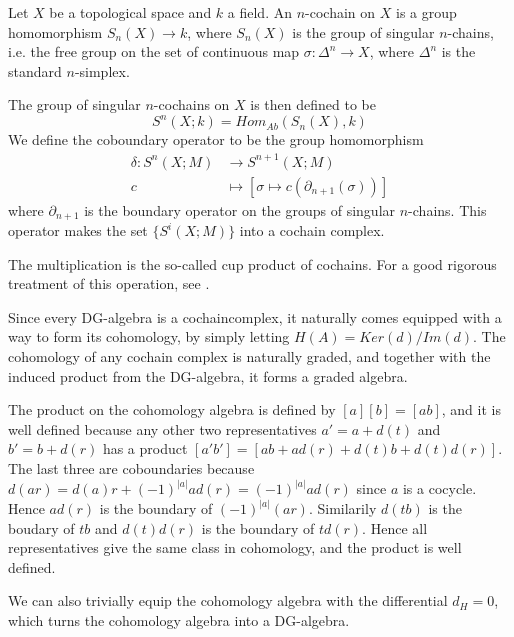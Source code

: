 \begin{example}
\label{ex:singular_cochain_algebra}
Let $X$ be a topological space and $k$ a field. An $n$-cochain on $X$ is a group homomorphism $S_n(X)\longrightarrow k$, where $S_n(X)$ is the group of singular $n$-chains, i.e. the free group on the set of continuous map $\sigma\colon\Delta^n\longrightarrow X$, where $\Delta^n$ is the standard $n$-simplex. 

The group of singular $n$-cochains on $X$ is then defined to be 
\begin{equation*}
S^n(X;k) = Hom_{Ab}(S_n(X), k)
\end{equation*}
We define the coboundary operator to be the group homomorphism
\begin{align*}
	\delta\colon S^n(X;M)&\longrightarrow S^{n+1}(X;M) \\
	c &\longmapsto [\sigma\mapsto c(\partial_{n+1}(\sigma))]
\end{align*}
where $\partial_{n+1}$ is the boundary operator on the groups of singular $n$-chains. This operator makes the set $\{S^i(X;M)\}$ into a cochain complex. 

The multiplication is the so-called cup product of cochains. For a good rigorous treatment of this operation, see \cite[Section 3.2.]{hatcher}. 
\end{example}

\begin{example}
\label{ex:cohomology}
Since every DG-algebra is a cochaincomplex, it naturally comes equipped with a way to form its cohomology, by simply letting $H(A)=Ker(d)/Im(d)$. The cohomology of any cochain complex is naturally graded, and together with the induced product from the DG-algebra, it forms a graded algebra. 
    
The product on the cohomology algebra is defined by $[a][b]=[ab]$, and it is well defined because any other two representatives $a'=a+d(t)$ and $b'=b+d(r)$ has a product $[a'b']=[ab+ad(r)+d(t)b+d(t)d(r)]$. The last three are coboundaries because $d(ar)=d(a)r + (-1)^{|a|}ad(r) = (-1)^{|a|}ad(r)$ since $a$ is a cocycle. Hence $ad(r)$ is the boundary of $(-1)^{|a|}(ar)$. Similarily $d(tb)$ is the boudary of $tb$ and $d(t)d(r)$ is the boundary of $td(r)$. Hence all representatives give the same class in cohomology, and the product is well defined. 
    
We can also trivially equip the cohomology algebra with the differential $d_H=0$, which turns the cohomology algebra into a DG-algebra. 
\end{example}

